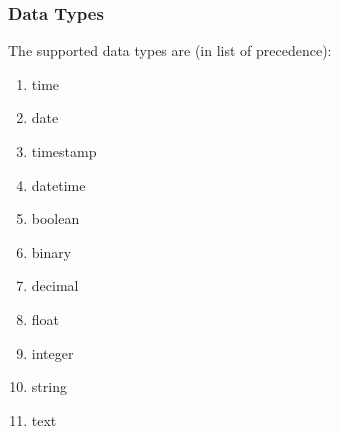 \subsubsection{Data Types}
\label{sec:data_types}

The supported data types are (in list of precedence):
\begin{enumerate}
	\item time
	\item date
	\item timestamp
	\item datetime
	\item boolean
	\item binary
	\item decimal
	\item float
	\item integer
	\item string
	\item text
\end{enumerate}
